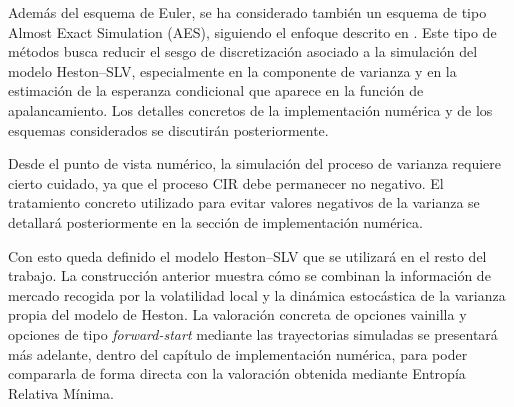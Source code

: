 Además del esquema de Euler, se ha considerado también un esquema de tipo Almost Exact Simulation (AES), siguiendo el enfoque descrito en \cite[Sec.~10.2.3]{oosterlee2021modelos}. Este tipo de métodos busca reducir el sesgo de discretización asociado a la simulación del modelo Heston--SLV, especialmente en la componente de varianza y en la estimación de la esperanza condicional que aparece en la función de apalancamiento. Los detalles concretos de la implementación numérica y de los esquemas considerados se discutirán posteriormente.\medskip


Desde el punto de vista numérico, la simulación del proceso de varianza requiere cierto cuidado, ya que el proceso CIR debe permanecer no negativo. El tratamiento concreto utilizado para evitar valores negativos de la varianza se detallará posteriormente en la sección de implementación numérica.\medskip

Con esto queda definido el modelo Heston--SLV que se utilizará en el resto del trabajo. La construcción anterior muestra cómo se combinan la información de mercado recogida por la volatilidad local y la dinámica estocástica de la varianza propia del modelo de Heston. La valoración concreta de opciones vainilla y opciones de tipo \textit{forward-start} mediante las trayectorias simuladas se presentará más adelante, dentro del capítulo de implementación numérica, para poder compararla de forma directa con la valoración obtenida mediante Entropía Relativa Mínima.
